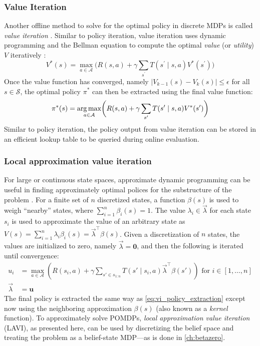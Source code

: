 \subsubsection{Value Iteration}\label{sec:value_iteration}
Another offline method to solve for the optimal policy in discrete MDPs is called \textit{value iteration} \cite{bellman1957dynamic}.
Similar to policy iteration, value iteration uses dynamic programming and the Bellman equation to compute the optimal \textit{value} (or \textit{utility}) $V$ iteratively \cite{dmubook}:
\begin{equation}\label{eq:value_function}
    V^*(s) = \max_{a \in \mathcal{A}} \biggl( R(s,a) + \gamma \sum_{s^\prime} T(s^\prime \mid s,a) V^*(s^\prime) \biggr)
\end{equation}
Once the value function has converged, namely $|V_{k-1}(s) - V_k(s)| \le \epsilon$ for all $s \in \mathcal{S}$, the optimal policy $\pi^*$ can then be extracted using the final value function:
\begin{equation}
    \pi^*(s) = \argmax_{a \in \mathcal{A}} \biggl( R(s,a) + \gamma \sum_{s^\prime} T(s^\prime \mid s, a) V^*(s^\prime) \biggr) \label{eq:vi_policy_extraction}
\end{equation}
Similar to policy iteration, the policy output from value iteration can be stored in an efficient lookup table to be queried during online evaluation.


\subsubsection{Local approximation value iteration}
For large or continuous state spaces, approximate dynamic programming can be useful in finding approximately optimal polices for the substructure of the problem \cite{dmubook}.
For a finite set of $n$ discretized states, a function $\beta(s)$ is used to weigh ``nearby'' states, where $\sum_{i=1}^n \beta_i(s) = 1$.
The value $\lambda_i \in \vec{\lambda}$ for each state $s_i$ is used to approximate the value of an arbitrary state as $V(s) = \sum_{i=1}^n \lambda_i \beta_i(s) = \vec{\lambda}^\top \beta(s)$.
Given a discretization of $n$ states, the values are initialized to zero, namely $\vec{\lambda} = \mathbf{0}$, and then the following is iterated until convergence:
\begin{align}
    u_i &= \max_{a \in \mathcal{A}} \left( R(s_i, a) + \gamma \sum_{s' \in s_{1:n}} T(s' \mid s_i, a)\vec{\lambda}^\top \beta(s') \right) \text{ for } i \in [1, \ldots, n] \\
    \vec{\lambda} &= \mathbf{u}
\end{align}
The final policy is extracted the same way as \cref{eq:vi_policy_extraction} except now using the neighboring approximation $\beta(s)$ (also known as a \textit{kernel} function).
To approximately solve POMDPs, \textit{local approximation value iteration} (LAVI), as presented here, can be used by discretizing the belief space and treating the problem as a belief-state MDP---as is done in \cref{ch:betazero}.

